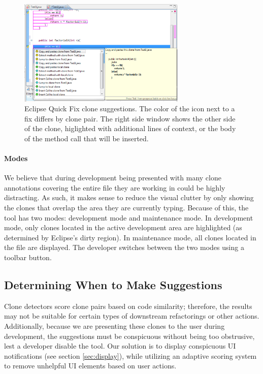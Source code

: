 \documentclass[nocopyrightspace,10pt]{sigplanconf}
\begin{document}
\begin{figure}[here]
\centering
\includegraphics[width=80mm]{img/screen1.eps}
\caption{Eclipse Quick Fix clone suggestions. The color of the icon
  next to a fix differs by clone pair. The right side window shows the
  other side of the clone, higlighted with additional lines of
  context, or the body of the method call that will be inserted.}
\label{fig:screenshot}
\end{figure}

\paragraph{Modes}
We believe that during development being presented with many 
clone annotations covering the entire file they are working in 
could be highly distracting.  As such, it makes sense to reduce the visual clutter
by only showing the clones that overlap the area they are currently typing.
Because of this, the tool has two modes: development mode and maintenance mode. In
development mode, only clones located in the active development area
are highlighted (as determined by Eclipse's dirty region). In
maintenance mode, all clones located in the file are displayed. The
developer switches between the two modes using a toolbar button.

\subsection{Determining When to Make Suggestions}

Clone detectors score clone pairs based on code similarity; therefore,
the results may not be suitable for certain types of downstream
refactorings or other actions.
Additionally,
because we are presenting these clones to the user during development,
the suggestions must be conspicuous without being too obstrusive, lest
a developer disable the tool.
Our solution is to display conspicuous UI notifications
(see section \ref{sec:display}), while utilizing an 
adaptive scoring system to remove unhelpful UI elements based
on user actions.  
\end{document}
